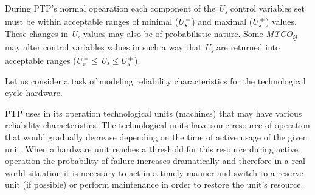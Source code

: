 \documentclass{article}
\begin{document}
\begin{minipage}[t]{0.45\textwidth}
    \hspace{0.2cm} During PTP’s normal opearation each component of the \textit{U\textsubscript{s}} control variables set must be within acceptable ranges of minimal ($U_{\mathit{\scriptsize s}}^{-}$) and maximal ($U_{\mathit{\scriptsize s}}^{+}$) values. These changes in \textit{U\textsubscript{s}} values may also be of probabilistic nature. Some \textit{MTCO\textsubscript{ij}} may alter control variables values in such a way that \textit{U\textsubscript{s}} are returned into acceptable ranges ($U_{\mathit{\scriptsize s}}^{-} \leq \textit{U\textsubscript{s}} \leq U_{\mathit{\scriptsize s}}^{+}$).
    
    \hspace{0.2cm} Let us consider a task of modeling reliability characteristics for the technological cycle hardware.

    \hspace{0.2cm} PTP uses in its operation technological units (machines) that may have various reliability characteristics. The technological units have some resource of operation that would gradually decrease depending on the time of active usage of the given unit. When a hardware unit reaches a threshold for this resource during active operation the probability of failure increases dramatically and therefore in a real world situation it is necessary to act in a timely manner and switch to a reserve unit (if possible) or perform maintenance in order to restore the unit’s resource.
 
\end{minipage}

\newpage
\end{document}
